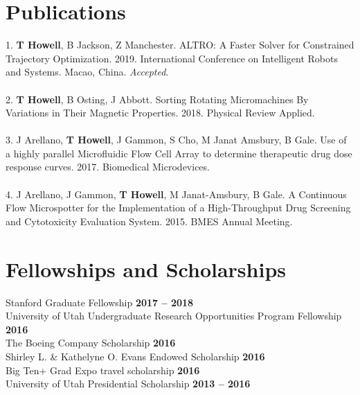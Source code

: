 \documentclass[margin,line]{res}
\begin{document}
\begin{resume}
\section{\sc Publications}
1. \textbf{T Howell}, B Jackson, Z Manchester. ALTRO: A Faster Solver for Constrained Trajectory Optimization. 2019. International Conference on Intelligent Robots and Systems. Macao, China. \textit{Accepted}.\\
\\
2. \textbf{T Howell}, B Osting, J Abbott. Sorting Rotating Micromachines By Variations in Their Magnetic
Properties. 2018. Physical Review Applied.\\
\\
3. J Arellano, \textbf{T Howell}, J Gammon, S Cho, M Janat Amsbury, B Gale. Use of a highly parallel
Microfluidic Flow Cell Array to determine therapeutic drug dose response curves. 2017. Biomedical
Microdevices.\\
\\
4. J Arellano, J Gammon, \textbf{T Howell}, M Janat-Amsbury, B Gale. A Continuous Flow Microspotter for
the Implementation of a High-Throughput Drug Screening and Cytotoxicity Evaluation System.
2015. BMES Annual Meeting.

\section{\sc Fellowships and Scholarships}
 Stanford Graduate Fellowship \hfill {\bf 2017 – 2018}\\
University of Utah Undergraduate Research Opportunities Program Fellowship \hfill {\bf 2016}\\
The Boeing Company Scholarship \hfill {\bf 2016}\\
Shirley L. \& Kathelyne O. Evans Endowed Scholarship \hfill {\bf 2016}\\
Big Ten+ Grad Expo travel scholarship \hfill {\bf 2016}\\
University of Utah Presidential Scholarship \hfill {\bf 2013 – 2016}
\\


\end{resume}
\end{document}
